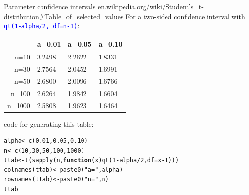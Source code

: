 \documentclass[xcolor=table,       handout,    xcolor=dvipsnames]{beamer}\usepackage[]{graphicx}\usepackage[]{color}
\makeatletter
\newcommand{\hlnum}[1]{\textcolor[rgb]{0,0,0}{#1}}
\newcommand{\hlstr}[1]{\textcolor[rgb]{0.545,0.137,0.137}{#1}}
\newcommand{\hlopt}[1]{\textcolor[rgb]{0,0,0}{#1}}
\newcommand{\hlstd}[1]{\textcolor[rgb]{0,0,0}{#1}}
\newcommand{\hlkwa}[1]{\textcolor[rgb]{1,0,0}{\textbf{#1}}}
\newcommand{\hlkwb}[1]{\textcolor[rgb]{0,0,0}{#1}}
\newcommand{\hlkwc}[1]{\textcolor[rgb]{1,0,1}{#1}}
\newcommand{\hlkwd}[1]{\textcolor[rgb]{0,0,1}{#1}}
\newenvironment{kframe}{%
 \def\at@end@of@kframe{}%
 \ifinner\ifhmode%
  \def\at@end@of@kframe{\end{minipage}}%
  \begin{minipage}{\columnwidth}%
 \fi\fi%
 \def\FrameCommand##1{\hskip\@totalleftmargin \hskip-\fboxsep
 \colorbox{shadecolor}{##1}\hskip-\fboxsep
     \hskip-\linewidth \hskip-\@totalleftmargin \hskip\columnwidth}%
 \MakeFramed {\advance\hsize-\width
   \@totalleftmargin\z@ \linewidth\hsize
   \@setminipage}}%
 {\par\unskip\endMakeFramed%
 \at@end@of@kframe}
\newenvironment{knitrout}{}{} %
\newcommand{\rcode}[1]{\texttt{\textcolor{Blue}{#1}}} %
\makeatother
\begin{document}
\begin{frame}[fragile]{Parameter confidence intervals}
\href{http://en.wikipedia.org/wiki/Student\%27s_t-distribution\#Table_of_selected_values}{en.wikipedia.org/wiki/Student's\_t-distribution\#Table\_of\_selected\_values}
For a two-sided confidence interval with \rcode{qt(1-alpha/2,  df=n-1)}:
\begin{center}
\begin{tabular}{| r | l | l | l |}   \hline
       & a=0.01 & a=0.05 & a=0.10 \\ \hline \hline
n=10   & 3.2498 & 2.2622 & 1.8331 \\ \hline
n=30   & 2.7564 & 2.0452 & 1.6991 \\ \hline
n=50   & 2.6800 & 2.0096 & 1.6766 \\ \hline
n=100  & 2.6264 & 1.9842 & 1.6604 \\ \hline
n=1000 & 2.5808 & 1.9623 & 1.6464 \\ \hline
\end{tabular}
\end{center}
code for generating this table:
\begin{knitrout}\small
{}\color{fgcolor}\begin{kframe}
\begin{alltt}
\hlstd{alpha} \hlkwb{<-} \hlkwd{c}\hlstd{(}\hlnum{0.01}\hlstd{,} \hlnum{0.05}\hlstd{,} \hlnum{0.10}\hlstd{)}
\hlstd{n} \hlkwb{<-} \hlkwd{c}\hlstd{(}\hlnum{10}\hlstd{,} \hlnum{30}\hlstd{,} \hlnum{50}\hlstd{,} \hlnum{100}\hlstd{,} \hlnum{1000}\hlstd{)}
\hlstd{ttab} \hlkwb{<-} \hlkwd{t}\hlstd{(}\hlkwd{sapply}\hlstd{(n,} \hlkwa{function}\hlstd{(}\hlkwc{x}\hlstd{)} \hlkwd{qt}\hlstd{(}\hlnum{1}\hlopt{-}\hlstd{alpha}\hlopt{/}\hlnum{2} \hlstd{,}\hlkwc{df}\hlstd{=x}\hlopt{-}\hlnum{1}\hlstd{)))}
\hlkwd{colnames}\hlstd{(ttab)} \hlkwb{<-} \hlkwd{paste0}\hlstd{(}\hlstr{"a="}\hlstd{,alpha)}
\hlkwd{rownames}\hlstd{(ttab)} \hlkwb{<-} \hlkwd{paste0}\hlstd{(}\hlstr{"n="}\hlstd{,n)}
\hlstd{ttab}
\end{alltt}
\end{kframe}
\end{knitrout}
\end{frame}

\end{document}
